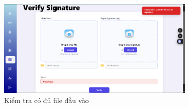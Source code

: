 \begin{description}
    \begin{figure}[H]
        \centering
        \includegraphics[width=0.85\textwidth]{img/9_verify/9_verify_no_files.png}
        \caption{Kiểm tra có đủ file đầu vào}
    \end{figure}

\end{description}
